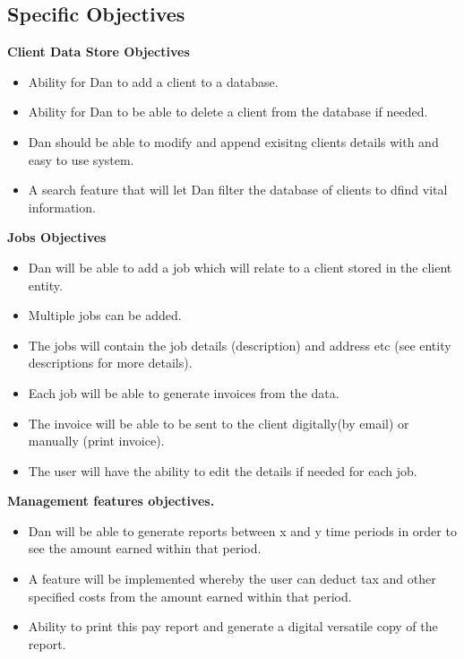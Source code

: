 \subsection{Specific Objectives}
	
	\textbf{Client Data Store Objectives}
	\begin{itemize}
		\item Ability for Dan to add a client to a database.
		\item Ability for Dan to be able to delete a client from the database if needed.
		\item Dan should be able to modify and append exisitng clients details with and easy to use system.
		\item A search feature that will let Dan filter the database of clients to dfind vital information.

	\end{itemize}
	
	\textbf{Jobs Objectives}
	\begin{itemize}
		\item Dan will be able to add a job which will relate to a client stored in the client entity.
		\item Multiple jobs can be added.
		\item The jobs will contain the job details (description) and address etc (see entity descriptions for more details).
		\item Each job will be able to generate invoices from the data.
		\item The invoice will be able to be sent to the client digitally(by email) or manually (print invoice).
		\item The user will have the ability to edit the details if needed for each job.
	
	\end{itemize}
	
	\textbf{Management features objectives.}
	
		\begin{itemize}
			\item Dan will be able to generate reports between x and y time periods in order to see the amount earned within that period.
			\item A feature will be implemented whereby the user can deduct tax and other specified costs from the amount earned within that period.
			\item Ability to print this pay report and generate a digital versatile copy of the report.
		\end{itemize}	


